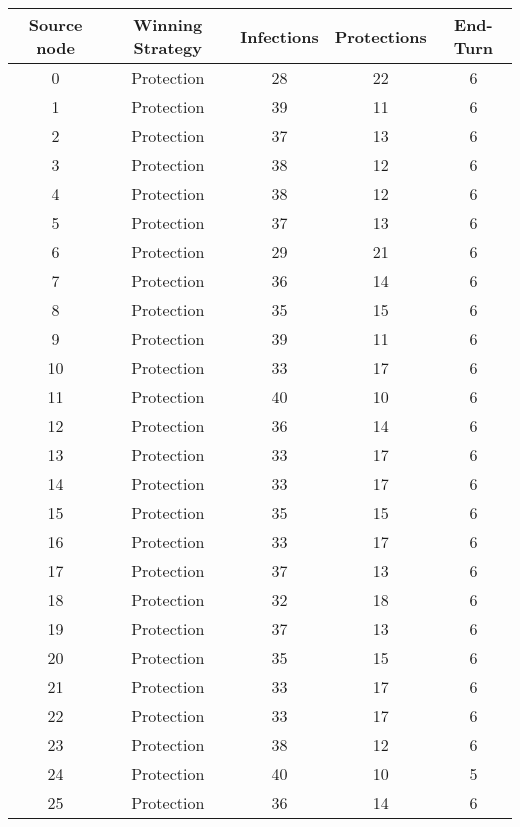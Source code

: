 \documentclass[results.tex]{subfiles}
\begin{document}
\begin{center}
  \begin{tabular}{| c || c | c | c | c |}
    \hline
    {\bfseries Source node} & {\bfseries Winning Strategy} & {\bfseries Infections} & {\bfseries Protections} & {\bfseries End-Turn} \\  %
    \hline\hline
    0 & Protection & 28 & 22 & 6 \\ 
    \hline
    1 & Protection & 39 & 11 & 6 \\ 
    \hline
    2 & Protection & 37 & 13 & 6 \\ 
    \hline
    3 & Protection & 38 & 12 & 6 \\ 
    \hline
    4 & Protection & 38 & 12 & 6 \\ 
    \hline
    5 & Protection & 37 & 13 & 6 \\ 
    \hline
    6 & Protection & 29 & 21 & 6 \\ 
    \hline
    7 & Protection & 36 & 14 & 6 \\ 
    \hline
    8 & Protection & 35 & 15 & 6 \\ 
    \hline
    9 & Protection & 39 & 11 & 6 \\ 
    \hline
    10 & Protection & 33 & 17 & 6 \\ 
    \hline
    11 & Protection & 40 & 10 & 6 \\ 
    \hline
    12 & Protection & 36 & 14 & 6 \\ 
    \hline
    13 & Protection & 33 & 17 & 6 \\ 
    \hline
    14 & Protection & 33 & 17 & 6 \\ 
    \hline
    15 & Protection & 35 & 15 & 6 \\ 
    \hline
    16 & Protection & 33 & 17 & 6 \\ 
    \hline
    17 & Protection & 37 & 13 & 6 \\ 
    \hline
    18 & Protection & 32 & 18 & 6 \\ 
    \hline
    19 & Protection & 37 & 13 & 6 \\ 
    \hline
    20 & Protection & 35 & 15 & 6 \\ 
    \hline
    21 & Protection & 33 & 17 & 6 \\ 
    \hline
    22 & Protection & 33 & 17 & 6 \\ 
    \hline
    23 & Protection & 38 & 12 & 6 \\ 
    \hline
    24 & Protection & 40 & 10 & 5 \\ 
    \hline
    25 & Protection & 36 & 14 & 6 \\ 

\end{tabular}
\end{center}
\end{document}
